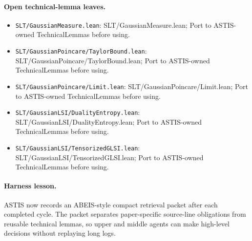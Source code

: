 \paragraph{Open technical-lemma leaves.}
\begin{itemize}
\item \texttt{SLT/GaussianMeasure.lean}: SLT/GaussianMeasure.lean; Port to ASTIS-owned TechnicalLemmas before using.
\item \texttt{SLT/GaussianPoincare/TaylorBound.lean}: SLT/GaussianPoincare/TaylorBound.lean; Port to ASTIS-owned TechnicalLemmas before using.
\item \texttt{SLT/GaussianPoincare/Limit.lean}: SLT/GaussianPoincare/Limit.lean; Port to ASTIS-owned TechnicalLemmas before using.
\item \texttt{SLT/GaussianLSI/DualityEntropy.lean}: SLT/GaussianLSI/DualityEntropy.lean; Port to ASTIS-owned TechnicalLemmas before using.
\item \texttt{SLT/GaussianLSI/TensorizedGLSI.lean}: SLT/GaussianLSI/TensorizedGLSI.lean; Port to ASTIS-owned TechnicalLemmas before using.
\end{itemize}

\paragraph{Harness lesson.}
ASTIS now records an ABEIS-style compact retrieval packet after each completed cycle.  The packet separates paper-specific source-line obligations from reusable technical lemmas, so upper and middle agents can make high-level decisions without replaying long logs.
